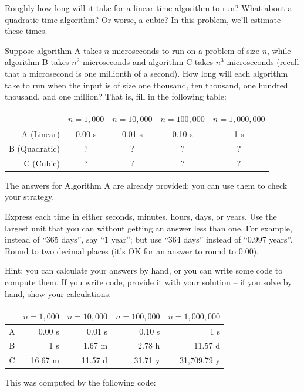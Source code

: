 \begin{prob}
    Roughly how long will it take for a linear time algorithm to run? What
    about a quadratic time algorithm? Or worse, a cubic? In this problem,
    we'll estimate these times.

    Suppose algorithm A takes $n$ microseconds to run on a problem of size $n$,
    while algorithm B takes $n^2$ microseconds and algorithm C takes $n^3$
    microseconds (recall that a microsecond is one millionth of a second).
    How long will each algorithm take to run when the input is of size one
    thousand, ten thousand, one hundred thousand, and one million? That is,
    fill in the following table:

    \begin{center}
    \begin{tabular}{rcccc}
        \toprule
        & $n = 1{,}000$ & $n = 10{,}000$ & $n = 100{,}000$ & $n = 1{,}000{,}000$ \\ \midrule
        A (Linear) & 0.00 s & 0.01 s & 0.10 s & 1 s \\
        B (Quadratic) & ? & ? & ? & ? \\
        C (Cubic) & ? & ? & ? & ? \\\bottomrule
    \end{tabular}
    \end{center}

    The answers for Algorithm A are already provided; you can use them to check your strategy.

    Express each time in either seconds, minutes, hours, days, or years. Use
    the largest unit that you can without getting an answer less than one. For
    example, instead of ``365 days'', say ``1 year''; but use ``364 days''
    instead of ``0.997 years''. Round to two decimal places (it's OK for an
    answer to round to 0.00).

    Hint: you can calculate your answers by hand, or you can write some code to compute them.
    If you write code, provide it with your solution -- if you solve by hand, show your calculations.

    \begin{soln}

        \begin{center}
        \begin{tabular}{rrrrr}
            \toprule
            & $n = 1{,}000$ & $n = 10{,}000$ & $n = 100{,}000$ & $n = 1{,}000{,}000$ \\ \midrule
            A & 0.00 s & 0.01 s & 0.10 s & 1 s \\
            B & 1 s & 1.67 m & 2.78 h & 11.57 d \\
            C & 16.67 m & 11.57 d & 31.71 y & 31{,}709.79 y \\\bottomrule
        \end{tabular}
        \end{center}

        This was computed by the following code:

        \inputminted{python}{\thisdir/include-solution/code.py}

    \end{soln}

\end{prob}
